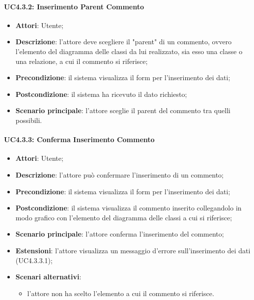 \paragraph{UC4.3.2: Inserimento Parent Commento}
\label{UC4.3.2}
\begin{itemize}
	\item \textbf{Attori}: Utente;
	\item \textbf{Descrizione}: l'attore deve scegliere il "parent" di un commento, ovvero l'elemento del diagramma delle classi da lui realizzato, sia esso una classe o una relazione, a cui il commento si riferisce;
	\item \textbf{Precondizione}: il sistema visualizza il form per l'inserimento dei dati;
	\item \textbf{Postcondizione}: il sistema ha ricevuto il dato richiesto;
	\item \textbf{Scenario principale}: l'attore sceglie il parent del commento tra quelli possibili.
\end{itemize}

\paragraph{UC4.3.3: Conferma Inserimento Commento}
\label{UC4.3.3}
\begin{itemize}
	\item \textbf{Attori}: Utente;
	\item \textbf{Descrizione}: l'attore può confermare l'inserimento di un commento;
	\item \textbf{Precondizione}: il sistema visualizza il form per l'inserimento dei dati;
	\item \textbf{Postcondizione}: il sistema visualizza il commento inserito collegandolo in modo grafico con l'elemento del diagramma delle classi a cui si riferisce;
	\item \textbf{Scenario principale}: l'attore conferma l'inserimento del commento;
	\item \textbf{Estensioni}: l'attore visualizza un messaggio d'errore sull'inserimento dei dati (UC4.3.3.1);
	\item \textbf{Scenari alternativi}:
	\begin{itemize}
		\item l'attore non ha scelto l'elemento a cui il commento si riferisce.
	\end{itemize}
\end{itemize}

